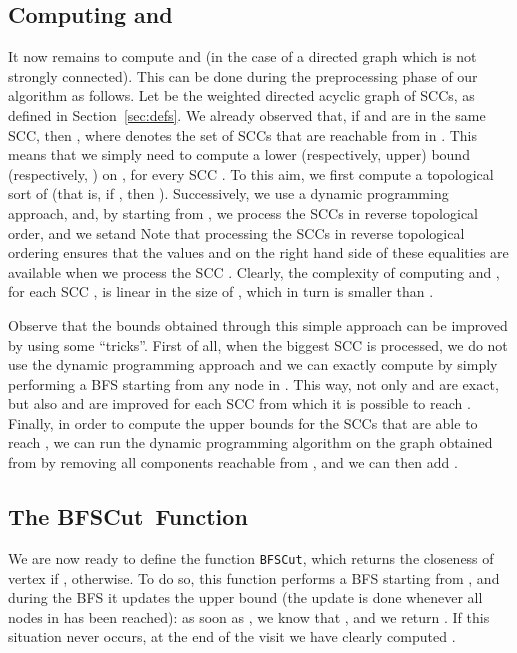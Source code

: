 \documentclass{acm_proc_article-sp}
\newcommand{\bfsc}{BFSCut}
\newcommand{\bfsctt}{\texttt{\upshape \bfsc}}
\begin{document}
\subsection{Computing  and }\label{sec:alphaomega}

It now remains to compute  and  (in the case of a directed graph which is not strongly connected). This can be done during the preprocessing phase of our algorithm as follows. Let  be the weighted directed acyclic graph of SCCs, as defined in Section~\ref{sec:defs}. We already observed that, if  and  are in the same SCC, then , where  denotes the set of SCCs that are reachable from  in . This means that we simply need to compute a lower (respectively, upper) bound  (respectively, ) on , for every SCC . To this aim, we first compute a topological sort  of  (that is, if , then ). Successively, we use a dynamic programming approach, and, by starting from , we process the SCCs in reverse topological order, and we setand Note that processing the SCCs in reverse topological ordering ensures that the values  and  on the right hand side of these equalities are available when we process the SCC . Clearly, the complexity of computing  and , for each SCC , is linear in the size of , which in turn is smaller than .

Observe that the bounds obtained through this simple approach can be improved by using some ``tricks''. First of all, when the biggest SCC  is processed, we do not use the dynamic programming approach and we can exactly compute  by simply performing a BFS starting from any node in . This way, not only  and  are exact, but also  and  are improved for each SCC  from which it is possible to reach . Finally, in order to compute the upper bounds for the SCCs that are able to reach , we can run the dynamic programming algorithm on the graph obtained from  by removing all components reachable from , and we can then add . 

\subsection{The \bfsc\ Function} \label{sec:bfsc}

We are now ready to define the function \bfsctt, which returns the closeness  of vertex  if ,  otherwise. To do so, this function performs a BFS starting from , and during the BFS it updates the upper bound  (the update is done whenever all nodes in  has been reached): as soon as , we know that , and we return . If this situation never occurs, at the end of the visit we have clearly computed .
\end{document}
